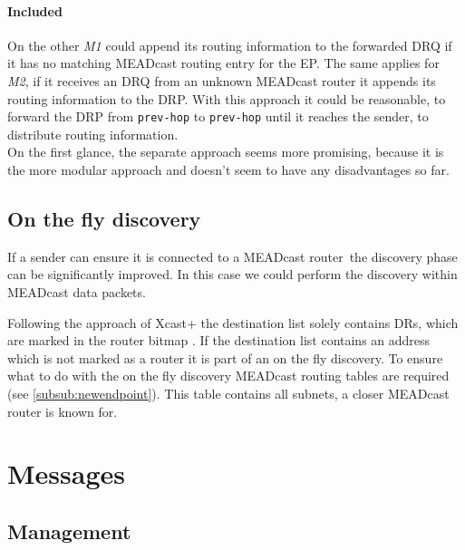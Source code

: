 \paragraph{Included} %
\label{par:Included}
On the other \textit{M1} could append its routing information to the forwarded
DRQ if it has no matching MEADcast routing entry for the EP.
The same applies for \textit{M2}, if it receives an DRQ from an unknown MEADcast
router it appends its routing information to the DRP.
With this approach it could be reasonable, to forward the DRP from
\texttt{prev-hop} to \texttt{prev-hop} until it reaches the sender, to
distribute routing information.\\

On the first glance, the separate approach seems more promising, because it is 
the more modular approach and doesn't seem to have any disadvantages so far.



\subsection{On the fly discovery} %
\label{sub:On the fly discovery}
If a sender can ensure it is connected to a MEADcast router\footnotemark\ the
discovery phase can be significantly improved.
In this case we could perform the discovery within MEADcast data packets.

Following the approach of Xcast+ \cite{xcast+} the destination list solely
contains DRs, which are marked in the router bitmap \cite{meadcast2}.
If the destination list contains an address which is not marked as a router it 
is part of an on the fly discovery.
To ensure what to do with the on the fly discovery MEADcast routing tables are
required (see \ref{subsub:newendpoint}).
This table contains all subnets, a closer MEADcast router is known for.



\section{Messages} %
\label{sec:Messages}

\subsection{Management} %
\label{sec:Management}

